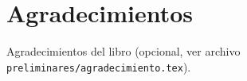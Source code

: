 

\chapter{Agradecimientos}

Agradecimientos del libro (opcional, ver archivo \texttt{preliminares/agradecimiento.tex}).

\cleardoublepage
\endinput
